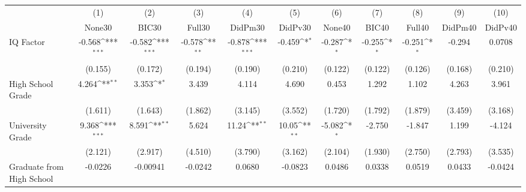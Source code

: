 {
\def\sym#1{\ifmmode^{#1}\else\(^{#1}\)\fi}
\begin{tabular}{l*{10}{c}}
\toprule
            &\multicolumn{1}{c}{(1)}&\multicolumn{1}{c}{(2)}&\multicolumn{1}{c}{(3)}&\multicolumn{1}{c}{(4)}&\multicolumn{1}{c}{(5)}&\multicolumn{1}{c}{(6)}&\multicolumn{1}{c}{(7)}&\multicolumn{1}{c}{(8)}&\multicolumn{1}{c}{(9)}&\multicolumn{1}{c}{(10)}\\
            &\multicolumn{1}{c}{None30}&\multicolumn{1}{c}{BIC30}&\multicolumn{1}{c}{Full30}&\multicolumn{1}{c}{DidPm30}&\multicolumn{1}{c}{DidPv30}&\multicolumn{1}{c}{None40}&\multicolumn{1}{c}{BIC40}&\multicolumn{1}{c}{Full40}&\multicolumn{1}{c}{DidPm40}&\multicolumn{1}{c}{DidPv40}\\
\midrule
IQ Factor   &      -0.568\sym{***}&      -0.582\sym{***}&      -0.578\sym{**} &      -0.878\sym{***}&      -0.459\sym{*}  &      -0.287\sym{*}  &      -0.255\sym{*}  &      -0.251\sym{*}  &      -0.294         &      0.0708         \\
            &     (0.155)         &     (0.172)         &     (0.194)         &     (0.190)         &     (0.210)         &     (0.122)         &     (0.122)         &     (0.126)         &     (0.168)         &     (0.210)         \\
\addlinespace
High School Grade&       4.264\sym{**} &       3.353\sym{*}  &       3.439         &       4.114         &       4.690         &       0.453         &       1.292         &       1.102         &       4.263         &       3.961         \\
            &     (1.611)         &     (1.643)         &     (1.862)         &     (3.145)         &     (3.552)         &     (1.720)         &     (1.792)         &     (1.879)         &     (3.459)         &     (3.168)         \\
\addlinespace
University Grade&       9.368\sym{***}&       8.591\sym{**} &       5.624         &       11.24\sym{**} &       10.05\sym{**} &      -5.082\sym{*}  &      -2.750         &      -1.847         &       1.199         &      -4.124         \\
            &     (2.121)         &     (2.917)         &     (4.510)         &     (3.790)         &     (3.162)         &     (2.104)         &     (1.930)         &     (2.750)         &     (2.793)         &     (3.535)         \\
\addlinespace
Graduate from High School&     -0.0226         &    -0.00941         &     -0.0242         &      0.0680         &     -0.0823         &      0.0486         &      0.0338         &      0.0519         &      0.0433         &     -0.0424         \\

\end{tabular}}
